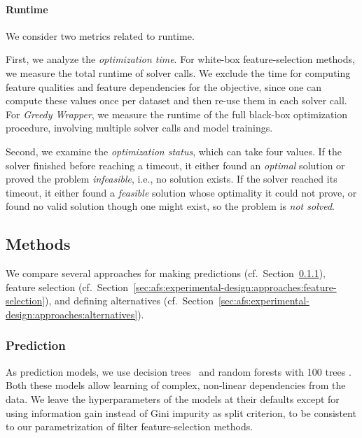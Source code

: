 \documentclass{article}
\theoremstyle{definition}
\begin{document}
\paragraph{Runtime}

We consider two metrics related to runtime.

First, we analyze the \emph{optimization time}.
For white-box feature-selection methods, we measure the total runtime of solver calls.
We exclude the time for computing feature qualities and feature dependencies for the objective, since one can compute these values once per dataset and then re-use them in each solver call.
For \emph{Greedy Wrapper}, we measure the runtime of the full black-box optimization procedure, involving multiple solver calls and model trainings.

Second, we examine the \emph{optimization status}, which can take four values.
If the solver finished before reaching a timeout, it either found an \emph{optimal} solution or proved the problem \emph{infeasible}, i.e., no solution exists.
If the solver reached its timeout, it either found a \emph{feasible} solution whose optimality it could not prove, or found no valid solution though one might exist, so the problem is \emph{not solved}.

\subsection{Methods}
\label{sec:afs:experimental-design:approaches}

We compare several approaches for making predictions (cf.~Section~\ref{sec:afs:experimental-design:approaches:prediction}), feature selection (cf.~Section~\ref{sec:afs:experimental-design:approaches:feature-selection}), and defining alternatives (cf.~Section~\ref{sec:afs:experimental-design:approaches:alternatives}).

\subsubsection{Prediction}
\label{sec:afs:experimental-design:approaches:prediction}

As prediction models, we use decision trees~\cite{breiman1984classification} and random forests with 100 trees \cite{breiman2001random}.
Both these models allow learning of complex, non-linear dependencies from the data.
We leave the hyperparameters of the models at their defaults except for using information gain instead of Gini impurity as split criterion, to be consistent to our parametrization of filter feature-selection methods.
\end{document}

